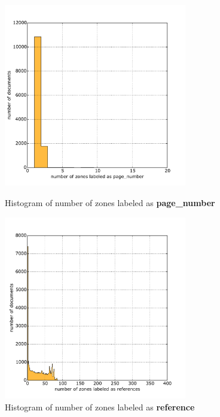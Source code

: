 \begin{figure}
\centering
\begin{minipage}[t!]{0.48\linewidth}
  \includegraphics[width=8cm]{plots/page_number_histogram}
  \caption{Histogram of number of zones labeled as \textbf{page\_number}}
  \label{fig:page_number_histogram}
\end{minipage}
\quad
\begin{minipage}[t!]{0.48\linewidth}
  \includegraphics[width=8cm]{plots/references_histogram}
  \caption{Histogram of number of zones labeled as \textbf{reference}}
  \label{fig:reference_histogram}
\end{minipage}
\end{figure}

